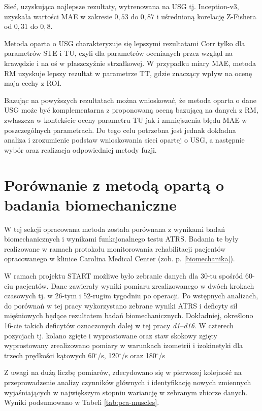 Sieć, uzyskująca najlepsze rezultaty, wytrenowana na USG tj. Inception-v3, uzyskała wartości MAE w zakresie $0,53$ do $0,87$ i uśrednioną korelację Z-Fishera od $0,31$ do $0,8$.

Metoda oparta o USG charakteryzuje się lepszymi rezultatami Corr tylko dla parametrów STE i TU, czyli dla parametrów ocenianych przez wzgląd na krawędzie i na oś w płaszczyźnie strzałkowej. W przypadku miary MAE, metoda RM uzyskuje lepszy rezultat w parametrze TT, gdzie znaczący wpływ na ocenę maja cechy z ROI.

Bazując na powyższych rezultatach można wnioskować, że metoda oparta o dane USG może być komplementarna z proponowaną oceną bazującą na danych z RM, zwłaszcza w kontekście oceny parametru TU jak i zmniejszenia błędu MAE w poszczególnych parametrach. Do tego celu potrzebna jest jednak dokładna analiza i zrozumienie podstaw wnioskowania sieci opartej o USG, a następnie wybór oraz realizacja odpowiedniej metody fuzji.

\section{Porównanie z metodą opartą o badania biomechaniczne}
\label{seq:comp-biomechanics}
W tej sekcji opracowana metoda została porównana z wynikami badań biomechanicznych i wynikami funkcjonalnego testu ATRS. Badania te były realizowane w ramach protokołu monitorowania rehabilitacji pacjentów opracowanego w klinice Carolina Medical Center (zob. p. \ref{biomechanika}). 

W ramach projektu START możliwe było zebranie danych dla 30-tu spośród 60-ciu pacjentów. Dane zawierały wyniki pomiaru zrealizowanego w dwóch krokach czasowych tj. w 26-tym i 52-rugim tygodniu po operacji. Po wstępnych analizach, do porównań w tej pracy wykorzystano zebrane wyniki ATRS i deficyty sił mięśniowych będące rezultatem badań biomechanicznych. Dokładniej, określono 16-cie takich deficytów oznaczonych dalej w tej pracy \textit{d1}--\textit{d16}. W czterech pozycjach tj. kolano zgięte i wyprostowane oraz staw skokowy zgięty wyprostowany zrealizowano pomiary w warunkach izometrii i izokinetyki dla trzech prędkości kątowych 60$^\circ$/s, 120$^\circ$/s oraz 180$^\circ$/s  

Z uwagi na dużą liczbę pomiarów, zdecydowano się w pierwszej kolejność na przeprowadzenie analizy czynników głównych i identyfikację nowych zmiennych wyjaśniających w największym stopniu wariancję w zebranym zbiorze danych. Wyniki podsumowano w Tabeli \ref{tab:pca-muscles}.

